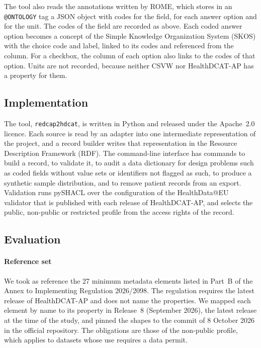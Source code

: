\documentclass[12pt]{article}
\newcommand{\code}[1]{\texttt{#1}}
\begin{document}
The tool also reads the annotations written by ROME, which stores in an
\code{@ONTOLOGY} tag a JSON object with codes for the field, for each answer option and
for the unit.\citep{meigen2026rome,romeformat} The codes of the field are recorded as above. Each coded answer option becomes a concept of the Simple Knowledge Organization System
(SKOS) with the choice code and label,
linked to its codes and referenced from the column. For a checkbox, the column of each
option also links to the codes of that option. Units are not recorded, because neither
CSVW nor HealthDCAT-AP has a property for them.

\subsection{Implementation}

The tool, \code{redcap2hdcat}, is written in Python and released under the Apache~2.0
licence. Each source is read by an adapter into one intermediate representation of the
project, and a record builder writes that representation in the Resource Description Framework
(RDF). The command-line interface has commands to build a record, to validate
it, to audit a data dictionary for design problems such as coded fields without value
sets or identifiers not flagged as such, to produce a synthetic sample distribution, and
to remove patient records from an export. Validation runs pySHACL\citep{shacl} over the
configuration of the HealthData@EU validator that is published with each release of
HealthDCAT-AP, and selects the public, non-public or restricted profile from the access
rights of the record.

\subsection{Evaluation}

\paragraph{Reference set} We took as reference the 27 minimum metadata elements listed
in Part~B of the Annex to Implementing Regulation 2026/2098.\citep{ir20262098} The
regulation requires the latest release of HealthDCAT-AP and does not name the properties. We
mapped each element by name to its property in Release~8 (September 2026), the latest
release at the time of the study, and pinned the shapes to the commit of 8 October 2026
in the official repository.\citep{healthdcatap} The obligations are those of the
non-public profile, which applies to datasets whose use requires a data permit.
\end{document}
